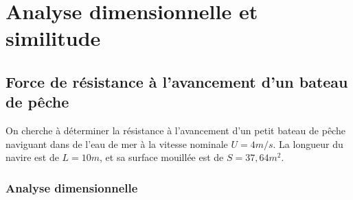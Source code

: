 

\section{Analyse dimensionnelle et similitude}

\subsection{Force de résistance à l'avancement d'un bateau de pêche}


On cherche à déterminer la résistance à l'avancement d'un petit bateau de pêche naviguant dans de l'eau de mer à la vitesse nominale {\color{red} $U = 4 m/s$}.
La longueur du navire est de $L = 10 m$, et sa surface mouillée est de $S = 37,64 m^2$. 


\subsubsection{Analyse dimensionnelle}

